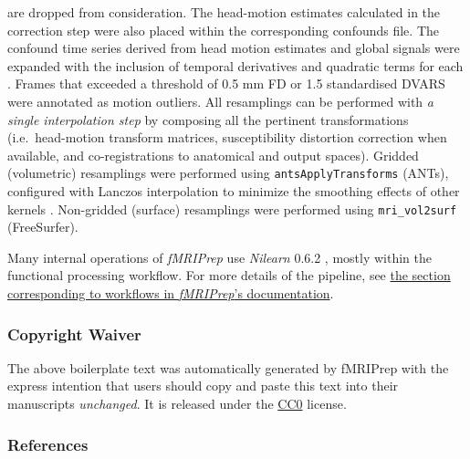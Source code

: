 \documentclass[]{article}
\begin{document}
\begin{description}
are dropped from consideration. The head-motion estimates calculated in
the correction step were also placed within the corresponding confounds
file. The confound time series derived from head motion estimates and
global signals were expanded with the inclusion of temporal derivatives
and quadratic terms for each \citep{confounds_satterthwaite_2013}.
Frames that exceeded a threshold of 0.5 mm FD or 1.5 standardised DVARS
were annotated as motion outliers. All resamplings can be performed with
\emph{a single interpolation step} by composing all the pertinent
transformations (i.e.~head-motion transform matrices, susceptibility
distortion correction when available, and co-registrations to anatomical
and output spaces). Gridded (volumetric) resamplings were performed
using \texttt{antsApplyTransforms} (ANTs), configured with Lanczos
interpolation to minimize the smoothing effects of other kernels
\citep{lanczos}. Non-gridded (surface) resamplings were performed using
\texttt{mri\_vol2surf} (FreeSurfer).
\end{description}

Many internal operations of \emph{fMRIPrep} use \emph{Nilearn} 0.6.2
\citep[RRID:SCR\_001362]{nilearn}, mostly within the functional
processing workflow. For more details of the pipeline, see
\href{https://fmriprep.readthedocs.io/en/latest/workflows.html}{the
section corresponding to workflows in \emph{fMRIPrep}'s documentation}.

\hypertarget{copyright-waiver}{%
\subsubsection{Copyright Waiver}\label{copyright-waiver}}

The above boilerplate text was automatically generated by fMRIPrep with
the express intention that users should copy and paste this text into
their manuscripts \emph{unchanged}. It is released under the
\href{https://creativecommons.org/publicdomain/zero/1.0/}{CC0} license.

\hypertarget{references}{%
\subsubsection{References}\label{references}}


\end{document}
